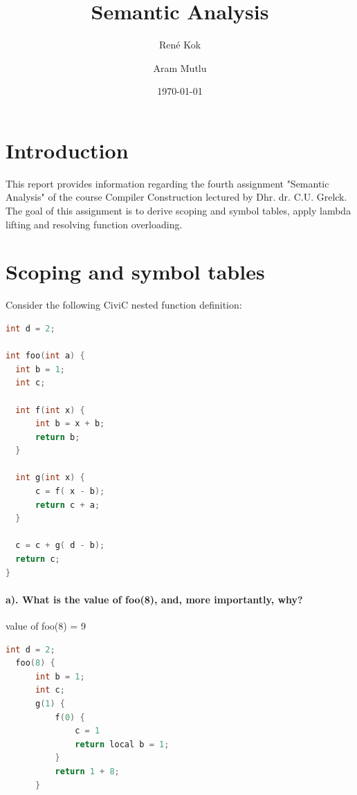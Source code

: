 \documentclass[hidelinks]{uva-inf-article}
\title{Semantic Analysis}
\author{René Kok}
\author{Aram Mutlu}
\date{\today}
\begin{document}
\maketitle


\section{Introduction}
\begin{flushleft}
\par This report provides information regarding the fourth assignment 
   "Semantic Analysis" of the course Compiler Construction lectured by Dhr. dr. C.U. Grelck. 
   The goal of this assignment is to derive scoping and symbol tables, apply lambda lifting and 
   resolving function overloading.
\newpage
\section{Scoping and symbol tables}
Consider the following CiviC nested function definition:
\begin{lstlisting}[basicstyle=\small, language=C, label=lst:code, caption=CiviC nested function definition, captionpos=b]
int d = 2;

int foo(int a) {
  int b = 1; 
  int c;

  int f(int x) { 
      int b = x + b;
      return b; 
  }

  int g(int x) { 
      c = f( x - b); 
      return c + a;
  }
    
  c = c + g( d - b); 
  return c;
}
\end{lstlisting}
\paragraph{a). What is the value of foo(8), and, more importantly, why?\\}
value of foo(8) = 9
\begin{lstlisting}[basicstyle=\small, language=C, label=lst:foo8, caption=Execution steps of running foo(8), captionpos=b]
  int d = 2;
  foo(8) {
      int b = 1;
      int c;
      g(1) {
          f(0) {
              c = 1
              return local b = 1;
          }
          return 1 + 8;
      }
      

\end{lstlisting}
\end{flushleft}
\end{document}
